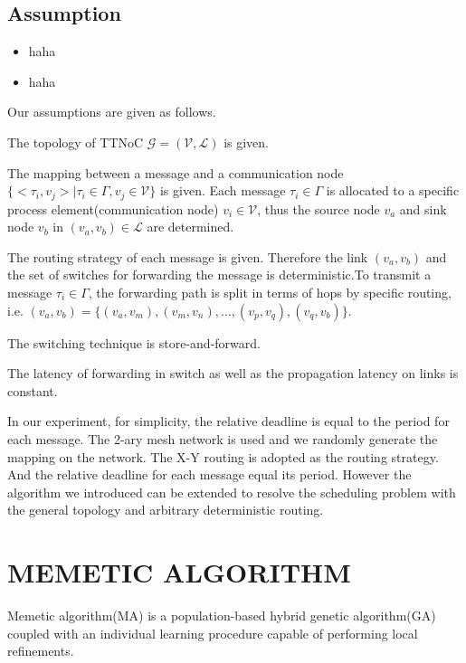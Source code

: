 \documentclass[journal]{IEEEtran}
\begin{document}
\subsection{Assumption}


\begin{itemize}
\item haha
\item haha
\end{itemize}

Our assumptions are given as follows. 

The topology of TTNoC $\mathcal{G}=(\mathcal{V},\mathcal{L})$ is given.

The mapping between a message and a communication node $\{ <\tau_{i} , v_{j}>\mid \tau_{i}\in\Gamma,v_{j}\in\mathcal{V} \}$ is given. Each message $\tau_{i}\in\Gamma$ is allocated to a specific process element(communication node) $v_{i}\in\mathcal{V}$, thus the source node $v_{a}$ and sink node $v_{b}$ in $(v_{a},v_{b})\in \mathcal{L}$ are determined.

The routing strategy of each message is given. Therefore the link $(v_{a},v_{b})$ and the set of switches for forwarding the message is deterministic.To transmit a message $ \tau_{i}\in\Gamma $, the forwarding path is split in terms of hops by specific routing, i.e. $(v_{a},v_{b})=\{(v_{a},v_{m}),(v_{m},v_{n}),\dots,(v_{p},v_{q}),(v_{q},v_{b})\}$. 

The switching technique is store-and-forward.

The latency of forwarding in switch as well as the propagation latency on links is constant.

In our experiment, for simplicity, the relative deadline is equal to the period for each message. The 2-ary mesh network is used and we randomly generate the mapping on the network. The X-Y routing is adopted as the routing strategy. And the relative deadline for each message equal its period. However the algorithm we introduced can be extended to resolve the scheduling problem with the general topology and arbitrary deterministic routing.

\section{MEMETIC ALGORITHM\label{s:algorithm}}

Memetic algorithm(MA) is a population-based hybrid genetic algorithm(GA) coupled with an individual learning procedure capable of performing local refinements\cite{DBLP:journals/cim/OngLC10}. 
\end{document}
